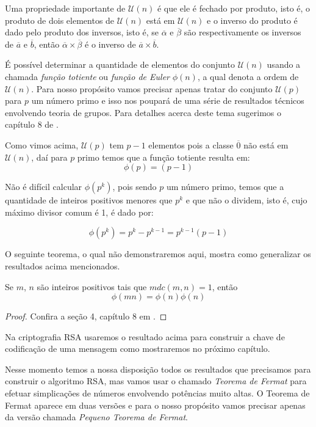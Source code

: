 Uma propriedade importante de $\mathcal{U}(n)$ \'{e} que ele \'{e} fechado por produto, isto \'{e}, o produto de dois 
elementos de $\mathcal{U}(n)$ est\'{a} em $\mathcal{U}(n)$ e o inverso do produto \'{e} dado pelo produto dos 
inversos, isto \'{e}, se $\overline{\alpha}$ e $\overline{\beta}$
s\~{a}o respectivamente os inversos de  $\overline{a}$ e $\overline{b}$,  ent\~{a}o $\overline{\alpha}\times\overline{\beta}$
\'{e} o inverso de $\overline{a}\times\overline{b}$. 

\'{E} poss\'{i}vel determinar a quantidade de elementos do conjunto $\mathcal{U}(n)$ usando a chamada \textsl{fun\c{c}\~{a}o 
totiente} ou \textsl{fun\c{c}\~{a}o de Euler} $\phi(n)$, a qual denota a ordem de $\mathcal{U}(n)$. Para nosso 
prop\'{o}sito vamos precisar apenas tratar do conjunto $\mathcal{U}(p)$ para $p$ um n\'{u}mero primo e isso nos poupar\'{a} de 
uma s\'{e}rie de resultados t\'{e}cnicos envolvendo teoria de grupos. Para detalhes acerca deste tema sugerimos
o cap\'{i}tulo 8 de \cite{cou:2014}. 

Como vimos acima, $\mathcal{U}(p)$ tem $p-1$ elementos pois a classe $\overline{0}$ n\~{a}o est\'{a} em $\mathcal{U}(n)$, 
da\'{i} para $p$ primo temos que a fun\c{c}\~{a}o totiente resulta em:
$$\phi(p)=(p-1)$$

N\~{a}o \'{e} dif\'{i}cil calcular $\phi(p^{k})$, pois sendo $p$ um n\'{u}mero primo, temos que a quantidade de inteiros 
positivos menores que $p^{k}$ e que n\~{a}o o dividem, isto \'{e}, cujo m\'{a}ximo divisor comum \'{e} 1, \'{e} dado por:

$$\phi(p^{k})=p^{k}-p^{k-1}=p^{k-1}(p-1)$$    

O seguinte teorema, o qual n\~{a}o demonstraremos aqui, mostra como generalizar os resultados acima mencionados.

\begin{Th}\label{totiente}
	Se $m$, $n$ s\~{a}o inteiros positivos tais que $mdc(m,n)=1$, ent\~{a}o $$\phi(mn)=\phi(n)\phi(n)$$
\end{Th}
\begin{proof}
	Confira a se\c{c}\~{a}o 4, cap\'{i}tulo 8 em \cite{cou:2014}.
\end{proof} 
 
Na criptografia RSA usaremos o resultado acima para construir a chave de codifica\c{c}\~{a}o de uma mensagem como mostraremos 
no pr\'{o}ximo cap\'{i}tulo. 

Nesse momento temos a nossa disposi\c{c}\~{a}o todos os resultados que precisamos para construir o algoritmo RSA, mas
vamos usar o chamado \textit{Teorema de Fermat} para efetuar simplica\c{c}\~{o}es de n\'{u}meros envolvendo pot\^{e}ncias
muito altas. O Teorema de Fermat aparece em duas vers\~{o}es e para o nosso prop\'{o}sito vamos precisar apenas da 
vers\~{a}o chamada \textit{Pequeno Teorema de Fermat}.

